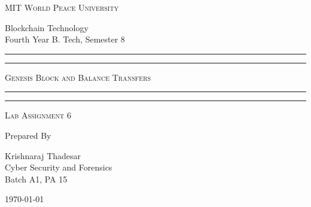\documentclass[11pt]{article}
\begin{document}
\begin{titlepage}
	\centering


	\huge\textsc{
		MIT World Peace University
	}\\

	\vspace{0.75\baselineskip} %

	\LARGE{
        Blockchain Technology\\
		Fourth Year B. Tech, Semester 8
	}

	\vfill %


	\rule{\textwidth}{1.6pt}\vspace*{-\baselineskip}\vspace*{2pt}
	\rule{\textwidth}{0.6pt}
	\vspace{0.75\baselineskip} %

	\huge{\textsc{
        Genesis Block and Balance Transfers
        }} \\

	\vspace{0.5\baselineskip} %
	\rule{\textwidth}{0.6pt}\vspace*{-\baselineskip}\vspace*{2.8pt}
	\rule{\textwidth}{1.6pt}

	\vspace{1\baselineskip} %


	\LARGE\textsc{
		Lab Assignment 6
	} %
	\vfill


	Prepared By \vspace{0.5\baselineskip} %

	\Large{
		Krishnaraj Thadesar \\
		Cyber Security and Forensics\\
        Batch A1, PA 15
	}

	\vspace{0.5\baselineskip} %
	\today

\end{titlepage}
\end{document}
